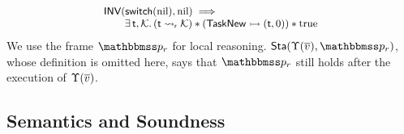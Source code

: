 \[
    \small
    \begin{array}{l}
        \textsf{INV}{(\mathsf{switch}(\text{nil}), \text{nil})}
        \implies \\
        \qquad
        \exists \, \textsf{t}, \mathcal{K}. \,
        ({\textsf{t}} \leadsto_{\textsf{r}} {\mathcal{K}}) *
        ({\mathsf{TaskNew}} \rightarrowtail {(\textsf{t}, 0)})
        * \text{true}
    \end{array}
\]
We use the frame $\relastP_r$ for local reasoning. 
$\Sta(\hprim(\args{\val}), \relastP_r)$, whose 
definition is omitted here, says that $\relastP_r$
still holds after the execution of $\Upsilon(\overline{v})$.

\subsection{Semantics and Soundness}
\label{subsec:semantics and soundness}

